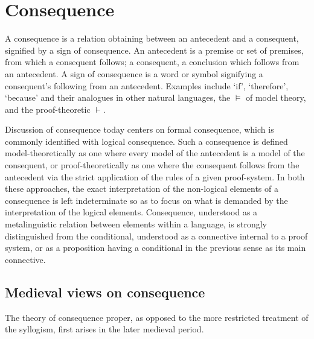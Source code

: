 \documentclass[a4paper,11pt]{article}
\begin{document}
\section{Consequence}
A consequence is a relation obtaining between an antecedent and a consequent, signified by a sign of consequence. An antecedent is a premise or set of premises, from which a consequent follows; a consequent, a conclusion which follows from an antecedent. A sign of consequence is a word or symbol signifying a consequent's following from an antecedent. Examples include  `if', `therefore', `because' and their analogues in other natural languages, the $\vDash$ of model theory, and the proof-theoretic $\vdash$. 

Discussion of consequence today centers on formal consequence, which is commonly identified with logical consequence. Such a consequence is defined model-theoretically as one where every model of the antecedent is a model of the consequent, or proof-theoretically as one where the consequent follows from the antecedent via the strict application of the rules of a given proof-system. In both these approaches, the exact interpretation of the non-logical elements of a consequence is left indeterminate so as to focus on what is demanded by the interpretation of the logical elements. Consequence, understood as a metalinguistic relation between elements within a language, is strongly distinguished from the conditional, understood as a connective internal to a proof system, or as a proposition having a conditional in the previous sense as its main connective.

\subsection{Medieval views on consequence}
The theory of consequence proper, as opposed to the more restricted treatment of the syllogism, first arises in the later medieval period. %
\end{document}
